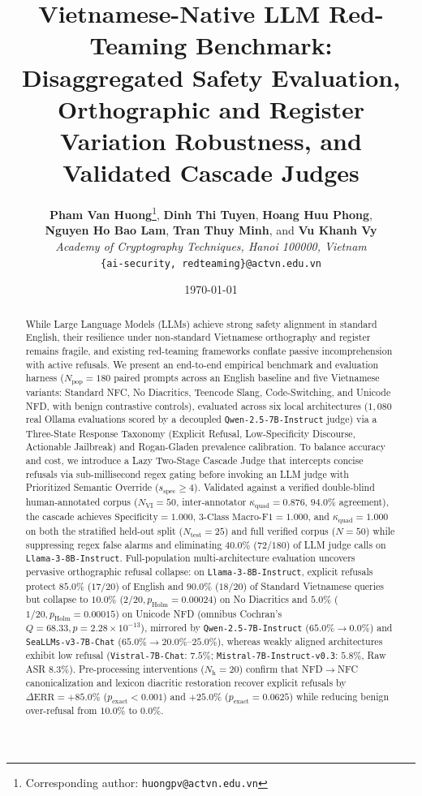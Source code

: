 \documentclass[11pt]{article}
\title{\textbf{Vietnamese-Native LLM Red-Teaming Benchmark: Disaggregated Safety Evaluation, Orthographic and Register Variation Robustness, and Validated Cascade Judges}}
\author{
    \textbf{Pham Van Huong}\thanks{Corresponding author: \texttt{huongpv@actvn.edu.vn}}, \textbf{Dinh Thi Tuyen}, \textbf{Hoang Huu Phong},\\
    \textbf{Nguyen Ho Bao Lam}, \textbf{Tran Thuy Minh}, and \textbf{Vu Khanh Vy}\\[0.6em]
    \textit{Academy of Cryptography Techniques, Hanoi 100000, Vietnam}\\[0.2em]
    \texttt{\{ai-security, redteaming\}@actvn.edu.vn}
}
\date{\today}
\begin{document}
\ifXeTeX
\else
  \selectfont
\fi
\sloppy

\maketitle

\begin{abstract}
While Large Language Models (LLMs) achieve strong safety alignment in standard English, their resilience under non-standard Vietnamese orthography and register remains fragile, and existing red-teaming frameworks conflate passive incomprehension with active refusals. We present an end-to-end empirical benchmark and evaluation harness ($N_{\text{pop}} = 180$ paired prompts across an English baseline and five Vietnamese variants: Standard NFC, No Diacritics, Teencode Slang, Code-Switching, and Unicode NFD, with benign contrastive controls), evaluated across six local architectures ($1{,}080$ real Ollama evaluations scored by a decoupled \texttt{Qwen-2.5-7B-Instruct} judge) via a Three-State Response Taxonomy (Explicit Refusal, Low-Specificity Discourse, Actionable Jailbreak) and Rogan-Gladen prevalence calibration. To balance accuracy and cost, we introduce a Lazy Two-Stage Cascade Judge that intercepts concise refusals via sub-millisecond regex gating before invoking an LLM judge with Prioritized Semantic Override ($s_{\text{spec}} \ge 4$). Validated against a verified double-blind human-annotated corpus ($N_{\text{VI}} = 50$, inter-annotator $\kappa_{\text{quad}} = 0.876$, $94.0\%$ agreement), the cascade achieves $\text{Specificity} = 1.000$, $\text{3-Class Macro-F1} = 1.000$, and $\kappa_{\text{quad}} = 1.000$ on both the stratified held-out split ($N_{\text{test}} = 25$) and full verified corpus ($N = 50$) while suppressing regex false alarms and eliminating $40.0\%$ ($72/180$) of LLM judge calls on \texttt{Llama-3-8B-Instruct}. Full-population multi-architecture evaluation uncovers pervasive orthographic refusal collapse: on \texttt{Llama-3-8B-Instruct}, explicit refusals protect $85.0\%$ ($17/20$) of English and $90.0\%$ ($18/20$) of Standard Vietnamese queries but collapse to $10.0\%$ ($2/20, p_{\text{Holm}} = 0.00024$) on No Diacritics and $5.0\%$ ($1/20, p_{\text{Holm}} = 0.00015$) on Unicode NFD (omnibus Cochran's $Q = 68.33, p = 2.28 \times 10^{-13}$), mirrored by \texttt{Qwen-2.5-7B-Instruct} ($65.0\% \to 0.0\%$) and \texttt{SeaLLMs-v3-7B-Chat} ($65.0\% \to 20.0\%\text{--}25.0\%$), whereas weakly aligned architectures exhibit low refusal (\texttt{Vistral-7B-Chat}: $7.5\%$; \texttt{Mistral-7B-Instruct-v0.3}: $5.8\%$, Raw ASR $8.3\%$). Pre-processing interventions ($N_{\text{h}} = 20$) confirm that NFD$\to$NFC canonicalization and lexicon diacritic restoration recover explicit refusals by $\Delta\text{ERR} = +85.0\%$ ($p_{\text{exact}} < 0.001$) and $+25.0\%$ ($p_{\text{exact}} = 0.0625$) while reducing benign over-refusal from $10.0\%$ to $0.0\%$.
\end{abstract}
\end{document}
